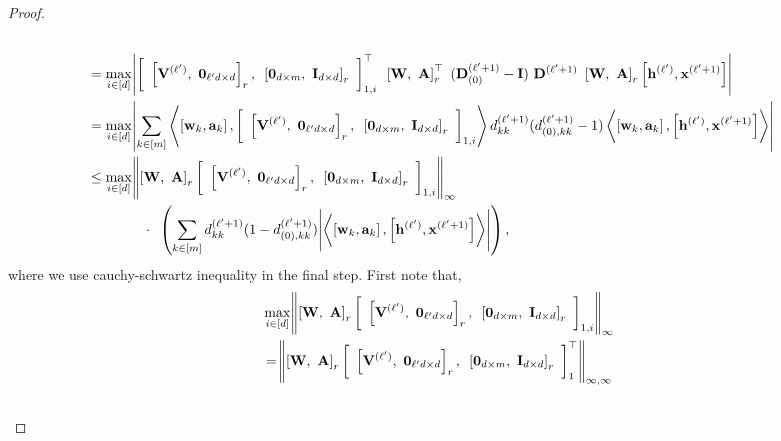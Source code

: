 \begin{proof}
\begin{align}
		\\&= \max_{i \in [d]} \abs{ \left[\text{ }\left[\mathbf{V}^{(\ell')}, \text{ } \mathbf{0}_{\ell'd \times d}\right]_r,\text{ } \left[\mathbf{0}_{d \times m},\text{ } \mathbf{I}_{d \times d}\right]_r\text{ }\right]_{1, i}^{\top}  \text{ } \left[\mathbf{W}, \text{ } \mathbf{A}\right]_r^{\top} \text{ } (\mathbf{D}^{(\ell'+1)}_{(0)} - \mathbf{I}) \text{ } \mathbf{D}^{(\ell'+1)} \text{ } \left[\mathbf{W}, \text{ } \mathbf{A}\right]_r \left[\mathbf{h}^{(\ell')}, \mathbf{x}^{(\ell'+1)}\right]} \nonumber\\&
		= \max_{i \in [d]} \abs{\sum_{k \in [m]} \left\langle \left[\mathbf{w}_k, \mathbf{a}_k\right], \left[\text{ }\left[\mathbf{V}^{(\ell')}, \text{ } \mathbf{0}_{\ell'd \times d}\right]_r,\text{ } \left[\mathbf{0}_{d \times m},\text{ } \mathbf{I}_{d \times d}\right]_r\text{ }\right]_{1, i}\right\rangle d^{(\ell'+1)}_{kk} (d^{(\ell'+1)}_{(0), kk} - 1) \left\langle \left[\mathbf{w}_k, \mathbf{a}_k\right],  \left[\mathbf{h}^{(\ell')}, \mathbf{x}^{(\ell'+1)}\right] \right\rangle} \nonumber
		\\&\le \max_{i \in [d]} \norm{\left[\mathbf{W}, \text{ } \mathbf{A}\right]_r \left[\text{ }\left[\mathbf{V}^{(\ell')}, \text{ } \mathbf{0}_{\ell'd \times d}\right]_r,\text{ } \left[\mathbf{0}_{d \times m},\text{ } \mathbf{I}_{d \times d}\right]_r\text{ }\right]_{1, i}}_{\infty} \nonumber \\& \quad\quad\quad\quad \cdot 
		\text{ }  \left( \sum_{k \in [m]} d^{(\ell'+1)}_{kk} (1 - d^{(\ell'+1)}_{(0), kk}) \abs{\left\langle \left[\mathbf{w}_k, \mathbf{a}_k\right],  \left[\mathbf{h}^{(\ell')}, \mathbf{x}^{(\ell'+1)}\right] \right\rangle} \right) \label{eq:eq15small1step},
	\end{align}
	\endgroup
	where we use cauchy-schwartz inequality in the final step. First note that,
	\begin{align*}
		&\max_{i \in [d]} \norm{\left[\mathbf{W}, \text{ } \mathbf{A}\right]_r \left[\text{ }\left[\bV^{(\ell')}, \text{ } \mathbf{0}_{\ell'd \times d}\right]_r,\text{ } \left[\mathbf{0}_{d \times m},\text{ } \mathbf{I}_{d \times d}\right]_r\text{ }\right]_{1, i}}_{\infty}\\&
		= \norm{\left[\mathbf{W}, \text{ } \mathbf{A}\right]_r \left[\text{ }\left[\bV^{(\ell')}, \text{ } \mathbf{0}_{\ell'd \times d}\right]_r,\text{ } \left[\mathbf{0}_{d \times m},\text{ } \mathbf{I}_{d \times d}\right]_r\text{ }\right]_{1}^{\top}}_{\infty, \infty} \\& 

\end{align*}
\end{proof}
